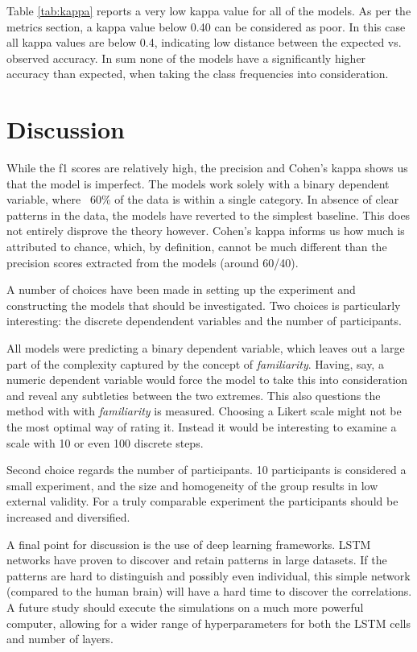 \documentclass{llncs}
\begin{document}
Table \ref{tab:kappa} reports a very low kappa value for all of the models. As per the metrics section, a kappa value below 0.40 can be considered as poor. In this case all kappa values are below 0.4, indicating low distance between the expected vs. observed accuracy. In sum none of the models have a significantly higher accuracy than expected, when taking the class frequencies into consideration.


\section{Discussion}
While the f1 scores are relatively high, the precision and Cohen's kappa shows us that the model is imperfect.
The models work solely with a binary dependent variable, where ~60\% of the data is within a single category.
In absence of clear patterns in the data, the models have reverted to the simplest baseline. This does not
entirely disprove the theory however. Cohen's kappa informs us how much is attributed to chance, which, by
definition, cannot be much different than the precision scores extracted from the models (around 60/40).

A number of choices have been made in setting up the experiment and constructing the models that should be
investigated. Two choices is particularly interesting: the discrete dependendent variables and the
number of participants.

All models were predicting a binary dependent variable, which leaves out a large part of the complexity
captured by the concept of \textit{familiarity}. Having, say, a numeric dependent variable would force the
model to take this into consideration and reveal any subtleties between the two extremes. This also questions
the method with with \textit{familiarity} is measured. Choosing a Likert scale might not be the most optimal
way of rating it. Instead it would be interesting to examine a scale with 10 or even 100 discrete steps.

Second choice regards the number of participants. 10 participants is considered a small experiment, and
the size and homogeneity of the group results in low external validity. For a truly comparable experiment
the participants should be increased and diversified.

A final point for discussion is the use of deep learning frameworks. LSTM networks have proven to discover
and retain patterns in large datasets. If the patterns are hard to distinguish and possibly even individual,
this simple network (compared to the human brain) will have a hard time to discover the correlations. A
future study should execute the simulations on a much more powerful computer, allowing for a wider range
of hyperparameters for both the LSTM cells and number of layers.
\end{document}
